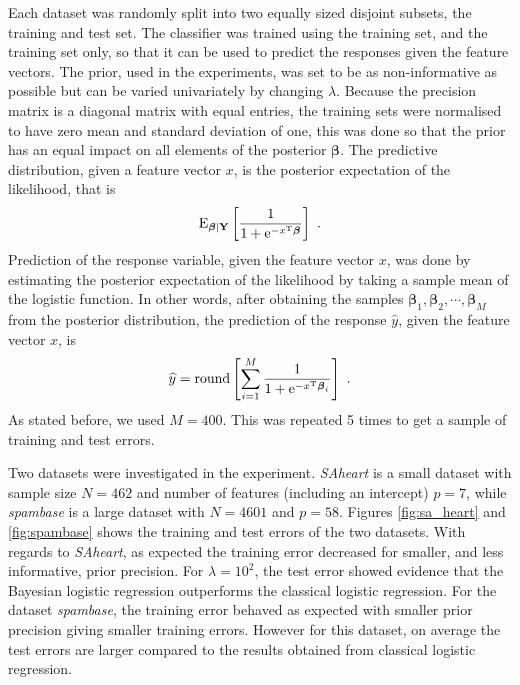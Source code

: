 \documentclass[a4paper]{article}\usepackage[]{graphicx}\usepackage[]{color}
\newcommand{\boldbeta}{\boldsymbol{\beta}}
\begin{document}
Each dataset was randomly split into two equally sized disjoint subsets, the training and test set. The classifier was trained using the training set, and the training set only, so that it can be used to predict the responses given the feature vectors. The prior, used in the experiments, was set to be as non-informative as possible but can be varied univariately by changing $\lambda$.
Because the precision matrix is a diagonal matrix with equal entries, the training sets were normalised to have zero mean and standard deviation of one, this was done so that the prior has an equal impact on all elements of the posterior $\boldbeta$. The predictive distribution, given a feature vector $x$, is the posterior expectation of the likelihood, that is
\begin{equation}
\textup{E}_{\boldbeta|\mathbf{Y}}\left[\dfrac{1}{1+\textup{e}^{- x^\textup{T}\boldbeta}}\right] \ .
\end{equation}
Prediction of the response variable, given the feature vector $x$, was done by estimating the posterior expectation of the likelihood by taking a sample mean of the logistic function. %
In other words, after obtaining the samples $\boldbeta_1,\boldbeta_2,\cdots,\boldbeta_{M}$ from the posterior distribution, the prediction of the response $\widehat{y}$, given the feature vector $x$, is
\begin{equation}
\widehat{y}=\textup{round}\left[\sum_{i=1}^{M}\dfrac{1}{1+\textup{e}^{- x^\textup{T}\boldbeta_i}}\right] \ .
\end{equation}
As stated before, we used $M=400$. This was repeated 5 times to get a sample of training and test errors.

Two datasets were investigated in the experiment. \emph{SAheart} is a small dataset with sample size $N=462$ and number of features (including an intercept) $p=7$, while \emph{spambase} is a large dataset with $N=4601$ and $p=58$. Figures \ref{fig:sa_heart} and \ref{fig:spambase} shows the training and test errors of the two datasets. With regards to \emph{SAheart}, as expected the training error decreased for smaller, and less informative, prior precision. For $\lambda=10^{2}$, the test error showed evidence that the Bayesian logistic regression outperforms the classical logistic regression. For the dataset \emph{spambase}, the training error behaved as expected with smaller prior precision giving smaller training errors. However for this dataset, on average the test errors are larger compared to the results obtained from classical logistic regression.
\end{document}
